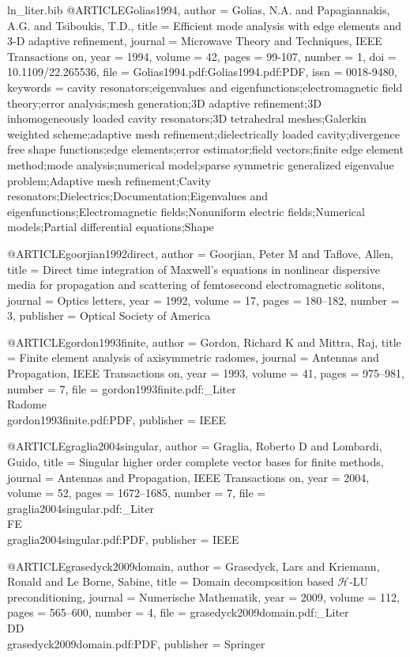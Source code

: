 \begin{filecontents*}{ln_liter.bib}
@ARTICLE{Golias1994,
  author = {Golias, N.A. and Papagiannakis, A.G. and Tsiboukis, T.D.},
  title = {Efficient mode analysis with edge elements and {3-D} adaptive refinement},
  journal = {Microwave Theory and Techniques, IEEE Transactions on},
  year = {1994},
  volume = {42},
  pages = {99-107},
  number = {1},
  doi = {10.1109/22.265536},
  file = {Golias1994.pdf:Golias1994.pdf:PDF},
  issn = {0018-9480},
  keywords = {cavity resonators;eigenvalues and eigenfunctions;electromagnetic field
	theory;error analysis;mesh generation;3D adaptive refinement;3D inhomogeneously
	loaded cavity resonators;3D tetrahedral meshes;Galerkin weighted
	scheme;adaptive mesh refinement;dielectrically loaded cavity;divergence
	free shape functions;edge elements;error estimator;field vectors;finite
	edge element method;mode analysis;numerical model;sparse symmetric
	generalized eigenvalue problem;Adaptive mesh refinement;Cavity resonators;Dielectrics;Documentation;Eigenvalues
	and eigenfunctions;Electromagnetic fields;Nonuniform electric fields;Numerical
	models;Partial differential equations;Shape}
}

@ARTICLE{goorjian1992direct,
  author = {Goorjian, Peter M and Taflove, Allen},
  title = {Direct time integration of {M}axwell's equations in nonlinear dispersive
	media for propagation and scattering of femtosecond electromagnetic
	solitons},
  journal = {Optics letters},
  year = {1992},
  volume = {17},
  pages = {180--182},
  number = {3},
  publisher = {Optical Society of America}
}

@ARTICLE{gordon1993finite,
  author = {Gordon, Richard K and Mittra, Raj},
  title = {Finite element analysis of axisymmetric radomes},
  journal = {Antennas and Propagation, IEEE Transactions on},
  year = {1993},
  volume = {41},
  pages = {975--981},
  number = {7},
  file = {gordon1993finite.pdf:_Liter\\Radome\\gordon1993finite.pdf:PDF},
  publisher = {IEEE}
}

@ARTICLE{graglia2004singular,
  author = {Graglia, Roberto D and Lombardi, Guido},
  title = {Singular higher order complete vector bases for finite methods},
  journal = {Antennas and Propagation, IEEE Transactions on},
  year = {2004},
  volume = {52},
  pages = {1672--1685},
  number = {7},
  file = {graglia2004singular.pdf:_Liter\\FE\\graglia2004singular.pdf:PDF},
  publisher = {IEEE}
}

@ARTICLE{grasedyck2009domain,
  author = {Grasedyck, Lars and Kriemann, Ronald and Le Borne, Sabine},
  title = {Domain decomposition based $\mathcal{H}$-LU preconditioning},
  journal = {Numerische Mathematik},
  year = {2009},
  volume = {112},
  pages = {565--600},
  number = {4},
  file = {grasedyck2009domain.pdf:_Liter\\DD\\grasedyck2009domain.pdf:PDF},
  publisher = {Springer}
}


\end{filecontents*}
